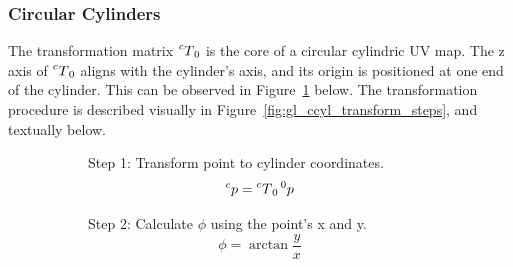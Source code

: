 \subsubsection{Circular Cylinders}
The transformation matrix $\prescript{c}{}T_0$ is the core of a circular cylindric UV map.
The z axis of $\prescript{c}{}T_0$ aligns with the cylinder's axis, and its origin is positioned at one end of the cylinder.
This can be observed in Figure~\ref{sfig:gl_ccyl_transformation} below.
The transformation procedure is described visually in Figure~\ref{fig:gl_ccyl_transform_steps}, and textually below.
\begin{figure}[htb]
	\centering
	\begin{subfigure}[b]{0.3\textwidth}
		\centering
{}
		\caption{%
Step 1: Transform point to cylinder coordinates.
\begin{equation*}
	\prescript{c}{}p = \prescript{c}{}T_0 \prescript{0}{}p
\end{equation*}
}
		\label{sfig:gl_ccyl_transformation}
	\end{subfigure}
	\hfill
	\begin{subfigure}[b]{0.3\textwidth}
		\centering
{}
		\caption{%
Step 2: Calculate $\phi$ using the point's x and y.
\begin{equation*}
	\phi = \arctan \frac{y}{x}
\end{equation*}
}
	\end{subfigure}
	\hfill
	\begin{subfigure}[b]{0.3\textwidth}

\end{subfigure}
\end{figure}
